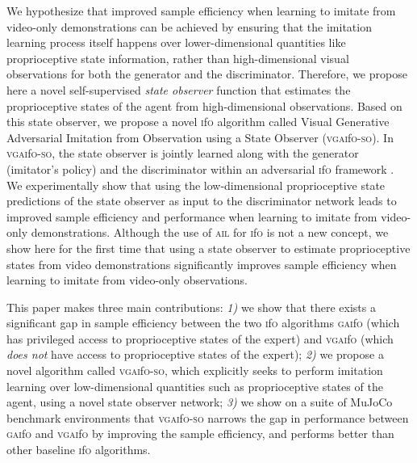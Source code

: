 \documentclass[letterpaper, 10 pt, conference]{ieeeconf}  %
\newcommand{\gaifo}{\textsc{gai}f\textsc{o}}
\newcommand{\ifo}{\textsc{i}f\textsc{o}}
\newcommand{\vgaifo}{\textsc{vgai}f\textsc{o}}
\newcommand{\vgaifoso}{\textsc{vgai}f\textsc{o}-\textsc{so}}
\newcommand{\ail}{\textsc{ail}}
\begin{document}
We hypothesize that improved sample efficiency when learning to imitate from video-only demonstrations can be achieved by ensuring that the imitation learning process itself happens over lower-dimensional quantities like proprioceptive state information, rather than high-dimensional visual observations for both the generator and the discriminator. Therefore, we propose here a novel self-supervised \textit{state observer} function that estimates the proprioceptive states of the agent from high-dimensional observations. 
Based on this state observer, we propose a novel \ifo{} algorithm called Visual Generative Adversarial Imitation from Observation using a State Observer (\vgaifoso{}). 
In \vgaifoso{}, the state observer is jointly learned along with the generator (imitator's policy) and the discriminator within an adversarial \ifo{} framework \cite{gaifo}. We experimentally show that using the low-dimensional proprioceptive state predictions of the state observer as input to the discriminator network leads to improved sample efficiency and performance when learning to imitate from video-only demonstrations. Although the use of \ail{} for \ifo{} is not a new concept, we show here for the first time that using a state observer to estimate proprioceptive states from video demonstrations significantly improves sample efficiency when learning to imitate from video-only observations.

This paper makes three main contributions: \textit{1)} we show that there exists a significant gap in sample efficiency between the two \ifo{} algorithms \gaifo{} (which has privileged access to proprioceptive states of the expert) and \vgaifo{} (which \textit{does not} have access to proprioceptive states of the expert); \textit{2)} we propose a novel algorithm called \vgaifoso{}, which explicitly seeks to perform imitation learning over low-dimensional quantities such as proprioceptive states of the agent, using a novel state observer network; \textit{3)} we show on a suite of MuJoCo benchmark environments \cite{mujoco, openai} that \vgaifoso{} narrows the gap in performance between \gaifo{} and \vgaifo{} by improving the sample efficiency, and performs better than other baseline \ifo{} algorithms. 
\end{document}
